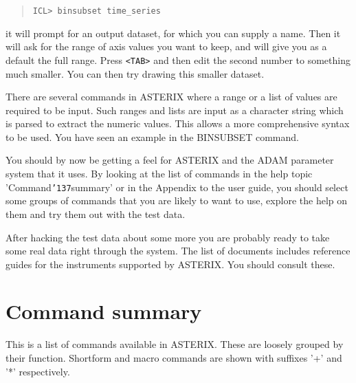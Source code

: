 \documentclass{book}
\renewcommand{\_}{{\tt\char'137}}     %
\begin{document}
\begin{quote}\begin{verbatim}
ICL> binsubset time_series
\end{verbatim}\end{quote}
it will prompt for an output dataset, for which you can supply a name.
Then it will ask for the range of axis values you want to keep, and
will give you as a default the full range. Press \verb+<TAB>+ and then edit
the second number to something much smaller. You can then try drawing
this smaller dataset.
 
There are several commands in ASTERIX where a range or a list of
values are required to be input. Such ranges and lists are input as a
character string which is parsed to extract the numeric values. This
allows a more comprehensive syntax to be used. You have seen an example
in the BINSUBSET command.
 
You should by now be getting a feel for ASTERIX and the ADAM parameter
system that it uses. By looking at the list of commands in the help
topic 'Command\_summary' or in the Appendix to the user guide, you should
select some groups of commands that you are likely to want to use, explore
the help on them and try them out with the test data.
 
After hacking the test data about some more you are probably ready to
take some real data right through the system. The list of documents
includes reference guides for the instruments supported by
ASTERIX. You should consult these.
 
\chapter{Command summary}
This is a list of commands available in ASTERIX. These are loosely
grouped by their function. Shortform and macro commands are shown
with suffixes '+' and '*' respectively.
 
\end{document}
